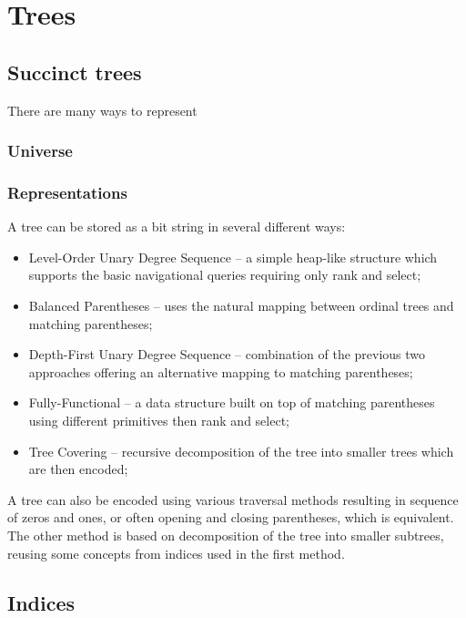\chapter{Trees}



\section{Succinct trees}

There are many ways to represent 

\subsection{Universe}


\subsection{Representations}

A tree can be stored as a bit string in several different ways:
\begin{itemize}
	\item Level-Order Unary Degree Sequence -- a simple heap-like structure which supports the basic navigational queries requiring only rank and select;
	\item Balanced Parentheses -- uses the natural mapping between ordinal trees and matching parentheses;
	\item Depth-First Unary Degree Sequence -- combination of the previous two approaches offering an alternative mapping to matching parentheses;
	\item Fully-Functional -- a data structure built on top of matching parentheses using different primitives then rank and select;
	\item Tree Covering -- recursive decomposition of the tree into smaller trees which are then encoded;
\end{itemize}


A tree can also be encoded using various traversal methods resulting in sequence of zeros and ones, or often opening and closing parentheses, which is equivalent.
The other method is based on decomposition of the tree into smaller subtrees, reusing some concepts from indices used in the first method.

\section{Indices}

